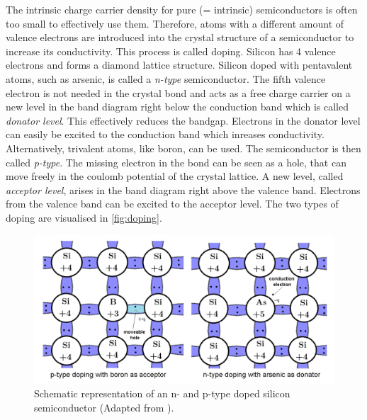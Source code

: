 The intrinsic charge carrier density for pure (= intrinsic) semiconductors is often too small to effectively use them. Therefore, atoms with a different amount of 
valence electrons are introduced
into the crystal structure of a semiconductor to increase its conductivity. This process is called doping. Silicon has 4 valence electrons and forms a diamond lattice structure. 
Silicon doped with pentavalent atoms, such as arsenic, is called a \textit{n-type} semiconductor. The fifth valence electron is not needed in the crystal bond and acts as a free 
charge carrier on a new level in the band diagram right below the conduction band which is called \textit{donator level}. This effectively reduces the bandgap. 
Electrons in the donator level can easily be excited to the conduction band which inreases conductivity. \\
Alternatively, trivalent atoms, like boron, can be used. The semiconductor is then called \textit{p-type}. The missing electron in the bond can be seen as a hole, that can
move freely in the coulomb potential of the crystal lattice. A new level, called \textit{acceptor level}, arises in the band diagram right above the valence band.
Electrons from the valence band can be excited to the acceptor level.
The two types of doping are visualised in \autoref{fig:doping}.
\begin{figure}
    \centering 
    \includegraphics[width = .75\textwidth]{content/pics/doping.png}
    \caption{Schematic representation of an n- and p-type doped silicon semiconductor (Adapted from \cite{SiliconStrip}).}
    \label{fig:doping}
\end{figure}

